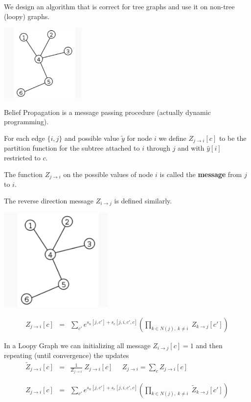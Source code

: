 {

We design an algorithm that is correct for tree graphs and use it on non-tree (loopy) graphs.


\centerline{\includegraphics[height=1.5in]{../images/Tree}}

\vfill
Belief Propagation is a message passing procedure (actually dynamic programming).

\vfill
For each edge $\{i,j\}$ and possible value $\tilde{y}$ for node $i$ we define {\color{red} $Z_{j \rightarrow i}[c]$}
to be  the partition function for the subtree attached to $i$ through $j$ and
with $\hat{y}[i]$ restricted to $c$.

\vfill
The function $Z_{j \rightarrow i}$ on the possible values of node $i$ is called the {\bf message} from $j$ to $i$.

\vfill
The reverse direction message $Z_{i \rightarrow j}$ is defined similarly.


\centerline{\includegraphics[height=2.0in]{../images/Tree}}

\vfill
\begin{eqnarray*}
  Z_{j\rightarrow i}[c] & = & \sum_{c'}  e^{s_n[j,c'] + s_e[j,i,c',c]}
    \left(\prod_{k \in N(j),\;k \not = i}\;Z_{k\rightarrow j}[c']\right)
\end{eqnarray*}


In a Loopy Graph we can initializing all message $Z_{i \rightarrow j}[c] = 1$ and then repeating (until convergence) the updates
\vfill
\begin{eqnarray*}
  \tilde{Z}_{j \rightarrow i}[c] & = & \frac{1}{Z_{j \rightarrow i}}\;Z_{j \rightarrow i}[c] \;\;\;\;\;Z_{j \rightarrow i} = \sum_{c} Z_{j \rightarrow i}[c] \\
  \\
  \\
  Z_{j\rightarrow i}[c] & = & \sum_{c'}  e^{s_n[j,c'] + s_e[j,i,c',c]}
    \left(\prod_{k \in N(j),\;k \not = i}\;\tilde{Z}_{k\rightarrow j}[c']\right)
\end{eqnarray*}

}
